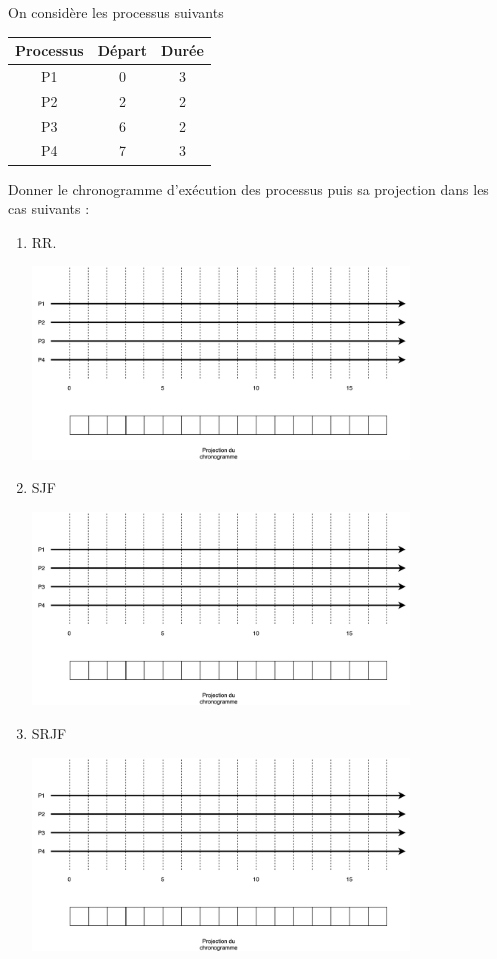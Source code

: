 \documentclass[a4paper,12pt,french]{article}
\begin{document}
On considère les processus suivants
\begin{center}
\begin{tabular}{|c|c|c|}
\hline\rowcolor{UGLiOrange}
\textbf{\color{white} Processus} & \textbf{\color{white}Départ} & \textbf{\color{white}Durée} \\
\hline
P1 & 0 & 3 \\
\hline
P2 & 2 & 2 \\
\hline
P3 & 6 & 2 \\
\hline
P4 & 7 & 3 \\
\hline
\end{tabular}
\end{center}
Donner le chronogramme d'exécution des processus puis sa projection dans les cas suivants :
\begin{enumerate}
	\item 	RR.
    \begin{center}
                     \includegraphics[width=10cm]{img/mc}\\
                     \end{center}
    \newpage
    
	\item 	SJF
    \begin{center}
                     \includegraphics[width=10cm]{img/mc}\\
                     \end{center}
    \item SRJF
    \begin{center}
                     \includegraphics[width=10cm]{img/mc}\\
                     \end{center}
    \end{enumerate}
\end{document}

